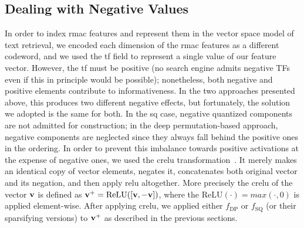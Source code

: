 

\subsection{Dealing with Negative Values}

In order to index \gls{rmac} features and represent them in the vector space model of text retrieval, we encoded each dimension of the \gls{rmac} features as a different codeword, and we used the \gls{tf} field to represent a single value of our feature vector.
However, the \gls{tf} must be positive (no search engine admits negative TFs even if this in principle would be possible);
nonetheless, both negative and positive elements contribute to informativeness.
In the two approaches presented above, this produces two different negative effects, but fortunately, the solution we adopted is the same for both.
In the \gls{sq} case, negative quantized components are not admitted for construction;
in the deep permutation-based approach, negative components are neglected since they always fall behind the positive ones in the ordering.
In order to prevent this imbalance towards positive activations at the expense of negative ones, we used the \gls{crelu} transformation~\cite{shang2016understanding}.
It merely makes an identical copy of vector elements, negates it, concatenates both original vector and its negation, and then apply \gls{relu} altogether.
More precisely the \gls{crelu} of the vector $\mathbf{v}$ is defined as $\mathbf{v}^+ = \text{ReLU}([\mathbf{v}, -\mathbf{v}])$, where the $\text{ReLU}(\cdot) = max(\cdot, 0)$ is applied element-wise.
After applying \gls{crelu}, we applied either $f_\text{DP}$ or $f_\text{SQ}$ (or their sparsifying versions) to $\mathbf{v}^+$ as described in the previous sections.

